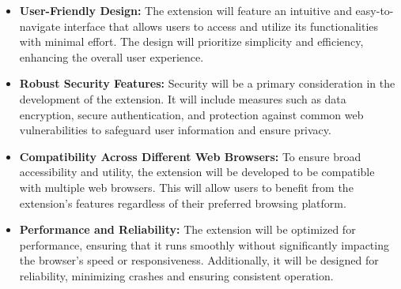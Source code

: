 \begin{itemize}
    \item \textbf{User-Friendly Design:}
    The extension will feature an intuitive and easy-to-navigate interface that allows users to access and utilize its functionalities with minimal effort. The design will prioritize simplicity and efficiency, enhancing the overall user experience.

    \item \textbf{Robust Security Features:}
    Security will be a primary consideration in the development of the extension. It will include measures such as data encryption, secure authentication, and protection against common web vulnerabilities to safeguard user information and ensure privacy.

    \item \textbf{Compatibility Across Different Web Browsers:}
    To ensure broad accessibility and utility, the extension will be developed to be compatible with multiple web browsers. This will allow users to benefit from the extension's features regardless of their preferred browsing platform.

    \item \textbf{Performance and Reliability:}
    The extension will be optimized for performance, ensuring that it runs smoothly without significantly impacting the browser’s speed or responsiveness. Additionally, it will be designed for reliability, minimizing crashes and ensuring consistent operation.
\end{itemize}
